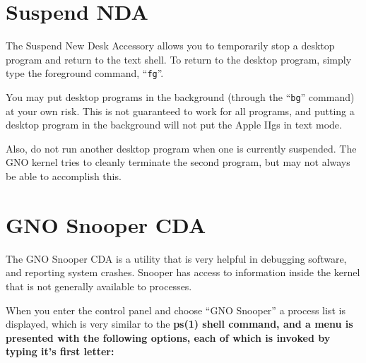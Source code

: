 \documentclass{report}
\begin{document}
\section{Suspend NDA}

The Suspend New Desk Accessory allows you
to temporarily stop a desktop program and return to the text
shell. To return to the desktop program, simply type the foreground
command, ``\texttt{fg}''.

You may put desktop programs in the background
(through the ``\texttt{bg}'' command) 
at your own risk. This is not guaranteed to work for all programs,
and putting a desktop program in the background will not put the
Apple IIgs in text mode.

Also, do not run another desktop program
when one is currently suspended. The GNO kernel tries to cleanly
terminate the second program, but may not always be able to
accomplish this.

\section{GNO Snooper CDA}

The GNO Snooper CDA is a utility that is
very helpful in debugging software, and reporting system crashes.
Snooper has access to information inside the kernel that is not
generally available to processes.

When you enter the control panel and choose
``GNO Snooper'' a process list is displayed, which is
very similar to the \bf ps\rm(1) shell command, and a menu is presented
with the following options, each of which is invoked by typing it's
first letter:
\end{document}
